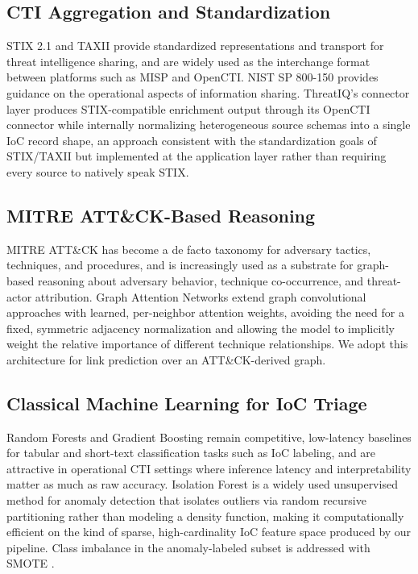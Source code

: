 \documentclass[conference]{IEEEtran}
\begin{document}
\subsection{CTI Aggregation and Standardization}
STIX 2.1 \cite{stix21} and TAXII provide standardized representations and transport for threat intelligence sharing, and are widely used as the interchange format between platforms such as MISP and OpenCTI. NIST SP 800-150 \cite{nist800150} provides guidance on the operational aspects of information sharing. ThreatIQ's connector layer produces STIX-compatible enrichment output through its OpenCTI connector while internally normalizing heterogeneous source schemas into a single IoC record shape, an approach consistent with the standardization goals of STIX/TAXII but implemented at the application layer rather than requiring every source to natively speak STIX.

\subsection{MITRE ATT\&CK-Based Reasoning}
MITRE ATT\&CK \cite{strom2018attack} has become a de facto taxonomy for adversary tactics, techniques, and procedures, and is increasingly used as a substrate for graph-based reasoning about adversary behavior, technique co-occurrence, and threat-actor attribution. Graph Attention Networks \cite{velickovic2018gat} extend graph convolutional approaches with learned, per-neighbor attention weights, avoiding the need for a fixed, symmetric adjacency normalization and allowing the model to implicitly weight the relative importance of different technique relationships. We adopt this architecture for link prediction over an ATT\&CK-derived graph.

\subsection{Classical Machine Learning for IoC Triage}
Random Forests \cite{breiman2001randomforest} and Gradient Boosting \cite{friedman2001gbm} remain competitive, low-latency baselines for tabular and short-text classification tasks such as IoC labeling, and are attractive in operational CTI settings where inference latency and interpretability matter as much as raw accuracy. Isolation Forest \cite{liu2008isolationforest} is a widely used unsupervised method for anomaly detection that isolates outliers via random recursive partitioning rather than modeling a density function, making it computationally efficient on the kind of sparse, high-cardinality IoC feature space produced by our pipeline. Class imbalance in the anomaly-labeled subset is addressed with SMOTE \cite{chawla2002smote}.
\end{document}
